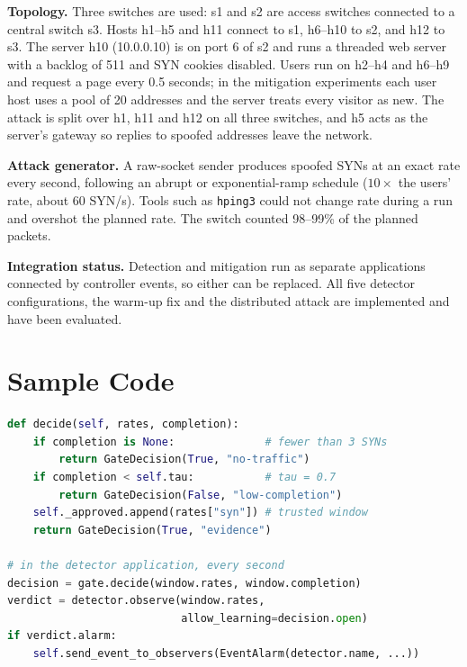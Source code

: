 \documentclass[12pt,a4paper,oneside]{report}
\begin{document}
\textbf{Topology.} Three switches are used: s1 and s2 are access switches connected to a central switch s3. Hosts h1--h5 and h11 connect to s1, h6--h10 to s2, and h12 to s3. The server h10 (10.0.0.10) is on port 6 of s2 and runs a threaded web server with a backlog of 511 and SYN cookies disabled. Users run on h2--h4 and h6--h9 and request a page every 0.5 seconds; in the mitigation experiments each user host uses a pool of 20 addresses and the server treats every visitor as new. The attack is split over h1, h11 and h12 on all three switches, and h5 acts as the server's gateway so replies to spoofed addresses leave the network.

\textbf{Attack generator.} A raw-socket sender produces spoofed SYNs at an exact rate every second, following an abrupt or exponential-ramp schedule ($10\times$ the users' rate, about 60 SYN/s). Tools such as \texttt{hping3} could not change rate during a run and overshot the planned rate. The switch counted 98--99\% of the planned packets.

\textbf{Integration status.} Detection and mitigation run as separate applications connected by controller events, so either can be replaced. All five detector configurations, the warm-up fix and the distributed attack are implemented and have been evaluated.

\section{Sample Code}
\begin{lstlisting}[language=Python,caption={Learning Gate decision and its use in the detector application}]
def decide(self, rates, completion):
    if completion is None:              # fewer than 3 SYNs
        return GateDecision(True, "no-traffic")
    if completion < self.tau:           # tau = 0.7
        return GateDecision(False, "low-completion")
    self._approved.append(rates["syn"]) # trusted window
    return GateDecision(True, "evidence")

# in the detector application, every second
decision = gate.decide(window.rates, window.completion)
verdict = detector.observe(window.rates,
                           allow_learning=decision.open)
if verdict.alarm:
    self.send_event_to_observers(EventAlarm(detector.name, ...))
\end{lstlisting}
\end{document}
